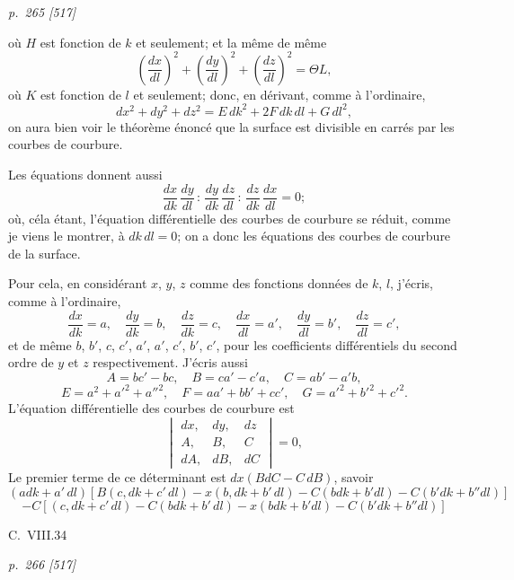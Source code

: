 \documentclass[11pt,a4paper]{article}
\theoremstyle{plain}
\theoremstyle{definition}
\newcommand{\dd}{\,d}
\begin{document}
\clearpage

\bigskip
\textit{p.~265 [517]}
\smallskip

\noindent
o\`u $H$ est fonction de $k$ et seulement; et la m\^eme de m\^eme
\[
\left(\frac{dx}{dl}\right)^2 + \left(\frac{dy}{dl}\right)^2 + \left(\frac{dz}{dl}\right)^2 = \Theta L,
\]
o\`u $K$ est fonction de $l$ et seulement; donc, en d\'erivant, comme \`a l'ordinaire,
\[
dx^2 + dy^2 + dz^2 = E\dd k^2 + 2F\,dk\,dl + G\,dl^2,
\]
on aura bien voir le th\'eor\`eme \'enonc\'e que la surface est divisible en carr\'es par les courbes
de courbure.

Les \'equations donnent aussi
\[
\frac{dx}{dk}\,\frac{dy}{dl} \, : \, \frac{dy}{dk}\,\frac{dz}{dl} \, : \, \frac{dz}{dk}\,\frac{dx}{dl} = 0;
\]
o\`u, c\'ela \'etant, l'\'equation diff\'erentielle des courbes de courbure se r\'eduit, comme je viens
le montrer, \`a $dk\,dl = 0$; on a donc les \'equations des courbes
de courbure de la surface.

Pour cela, en consid\'erant $x$, $y$, $z$ comme des fonctions donn\'ees de $k$, $l$, j'\'ecris,
comme \`a l'ordinaire,
\[
\frac{dx}{dk} = a, \quad \frac{dy}{dk} = b, \quad \frac{dz}{dk} = c, \quad \frac{dx}{dl} = a', \quad \frac{dy}{dl} = b', \quad \frac{dz}{dl} = c',
\]
et de m\^eme $b$, $b'$, $c$, $c'$, $a'$, $a'$, $c'$, $b'$, $c'$, pour les coefficients diff\'erentiels du second ordre de $y$ et $z$
respectivement.  J'\'ecris aussi
\[
A = bc' - bc, \quad B = ca' - c'a, \quad C = ab' - a'b,
\]
\[
E = a^2 + a'^2 + a''^2, \quad F = a a' + b b' + cc', \quad G = a'^2 + b'^2 + c'^2.
\]
L'\'equation diff\'erentielle des courbes de courbure est
\[
\begin{vmatrix}
dx, & dy, & dz \\
A, & B, & C \\
dA, & dB, & dC
\end{vmatrix} = 0,
\]
Le premier terme de ce d\'eterminant est $dx(BdC - C\, dB)$, savoir
\[
(adk + a'\,dl)\!\left[B(c, dk + c'\,dl) - x(b, dk + b'\,dl) - C(b dk + b'dl) - C(b' dk + b''dl)\right]
\]
\[
- C[(c, dk + c'\,dl) - C(b dk + b'\,dl) - x(b dk + b' dl) - C(b' dk + b'' dl)]
\]

C.\ VIII.\hfill 34

\clearpage

\bigskip
\textit{p.~266 [517]}
\smallskip
\end{document}
